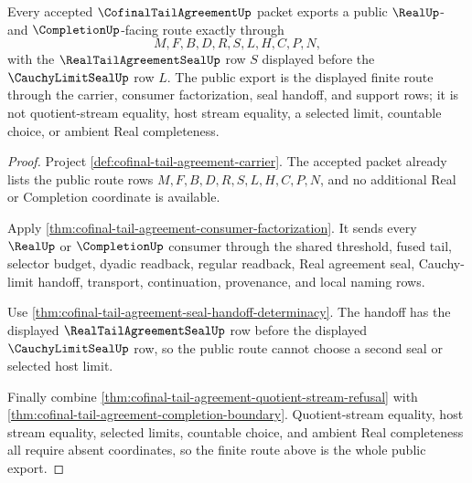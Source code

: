 \begin{theorem}
\label{thm:cofinal-tail-agreement-public-export}
Every accepted $\CofinalTailAgreementUp$ packet exports a public $\RealUp$- and $\CompletionUp$-facing route exactly through
$$
M,F,B,D,R,S,L,H,C,P,N,
$$
with the $\RealTailAgreementSealUp$ row $S$ displayed before the $\CauchyLimitSealUp$ row $L$. The public export is the displayed finite route through the carrier, consumer factorization, seal handoff, and support rows; it is not quotient-stream equality, host stream equality, a selected limit, countable choice, or ambient Real completeness.
\end{theorem}
\begin{proof}
Project \autoref{def:cofinal-tail-agreement-carrier}. The accepted packet already lists the public route rows $M,F,B,D,R,S,L,H,C,P,N$, and no additional Real or Completion coordinate is available.

Apply \autoref{thm:cofinal-tail-agreement-consumer-factorization}. It sends every $\RealUp$ or $\CompletionUp$ consumer through the shared threshold, fused tail, selector budget, dyadic readback, regular readback, Real agreement seal, Cauchy-limit handoff, transport, continuation, provenance, and local naming rows.

Use \autoref{thm:cofinal-tail-agreement-seal-handoff-determinacy}. The handoff has the displayed $\RealTailAgreementSealUp$ row before the displayed $\CauchyLimitSealUp$ row, so the public route cannot choose a second seal or selected host limit.

Finally combine \autoref{thm:cofinal-tail-agreement-quotient-stream-refusal} with \autoref{thm:cofinal-tail-agreement-completion-boundary}. Quotient-stream equality, host stream equality, selected limits, countable choice, and ambient Real completeness all require absent coordinates, so the finite route above is the whole public export.
\end{proof}

